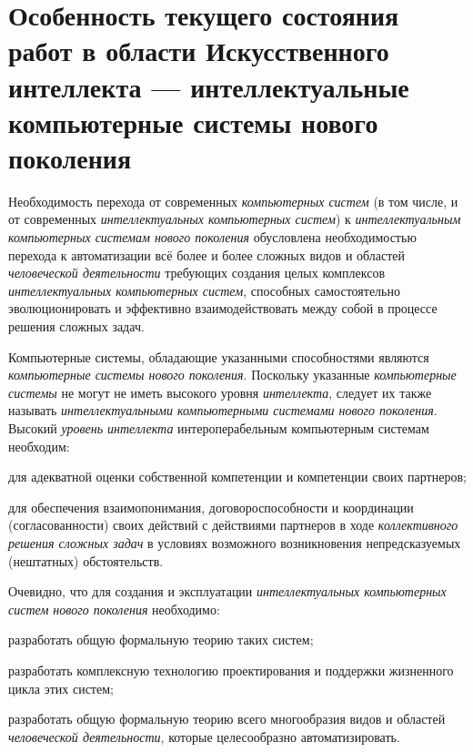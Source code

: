 \section*{Особенность текущего состояния работ в области Искусственного интеллекта --- интеллектуальные компьютерные системы нового поколения}
\label{concl_feature_current_state_work_field_AI}

Необходимость перехода от современных \textit{компьютерных систем} (в том числе, и от современных \textit{интеллектуальных компьютерных систем}) к \textit{интеллектуальным компьютерных системам нового поколения} обусловлена необходимостью перехода к автоматизации всё более и более сложных видов и областей \textit{человеческой деятельности} требующих создания целых комплексов \textit{интеллектуальных компьютерных систем}, способных самостоятельно эволюционировать и эффективно взаимодействовать между собой в процессе  решения сложных задач.

Компьютерные системы, обладающие указанными способностями являются \textit{компьютерные системы нового поколения}. Поскольку указанные \textit{компьютерные системы} не могут не иметь высокого уровня \textit{интеллекта}, следует их также называть \textit{интеллектуальными компьютерными системами нового поколения}. Высокий \textit{уровень интеллекта} интероперабельным компьютерным системам необходим:
\begin{textitemize}
	\item для адекватной оценки собственной компетенции и компетенции своих партнеров;
	\item для обеспечения взаимопонимания, договороспособности и координации (согласованности) своих действий с действиями партнеров в ходе \textit{коллективного решения сложных задач} в условиях возможного возникновения непредсказуемых (нештатных) обстоятельств.
\end{textitemize}

Очевидно, что для создания и эксплуатации \textit{интеллектуальных компьютерных систем нового поколения} необходимо:
\begin{textitemize}
	\item разработать общую формальную теорию таких систем;
	\item разработать комплексную технологию проектирования и поддержки жизненного цикла этих систем;
	\item разработать общую формальную теорию всего многообразия видов и областей \textit{человеческой деятельности}, которые целесообразно автоматизировать.
\end{textitemize}

